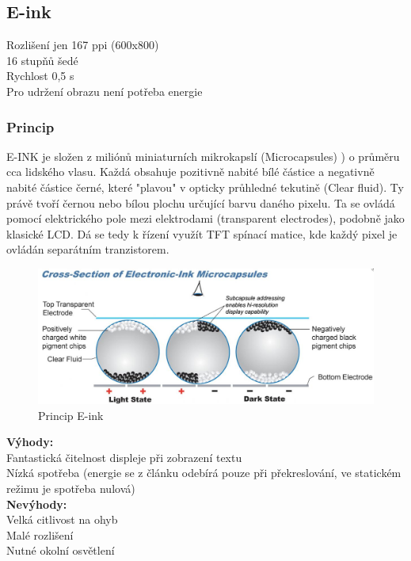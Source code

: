 \subsection{E-ink}
Rozlišení jen 167 ppi (600x800)\\
16 stupňů šedé\\
Rychlost 0,5 s\\
Pro udržení obrazu není potřeba energie\\
\subsubsection{Princip}
E-INK je složen z miliónů miniaturních mikrokapslí (Microcapsules) ) o průměru cca lidského vlasu. Každá obsahuje pozitivně nabité bílé částice a negativně nabité částice černé, které "plavou" v opticky průhledné tekutině (Clear fluid). Ty právě tvoří černou nebo bílou plochu určující barvu daného pixelu. Ta se ovládá pomocí elektrického pole mezi elektrodami (transparent electrodes), podobně jako klasické LCD. Dá se tedy k řízení využít TFT spínací matice, kde každý pixel je ovládán separátním tranzistorem.
    \begin{figure}[h]
   \begin{center}
     \includegraphics[scale=0.4]{images/EINK.png}
   \end{center}
   \caption{Princip E-ink}
  \end{figure}

\textbf{Výhody:}\\
Fantastická čitelnost displeje při zobrazení textu\\
Nízká spotřeba (energie se z článku odebírá pouze při překreslování, ve
statickém režimu je spotřeba nulová)\\
\textbf{Nevýhody:}\\
Velká citlivost na ohyb\\
Malé rozlišení\\
Nutné okolní osvětlení\\

